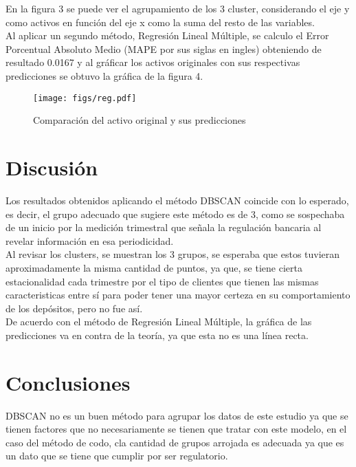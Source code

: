\documentclass{article}
\begin{document}
En la figura 3 se puede ver el agrupamiento de los 3 cluster, considerando el eje y como activos en función del eje x como la suma del resto de las variables.
\\

Al aplicar un segundo método, Regresión Lineal Múltiple, se calculo el Error Porcentual Absoluto Medio (MAPE por sus siglas en ingles) obteniendo de resultado 0.0167 y al gráficar los activos originales con sus respectivas predicciones se obtuvo la gráfica de la figura 4.
\\

\begin{figure}
    \centering
    \texttt{[image: figs/reg.pdf]}
    \caption{Comparación del activo original y sus predicciones}
    \label{}
\end{figure}



\section{Discusión}

Los resultados obtenidos aplicando el método DBSCAN coincide con lo esperado, es decir, 
 el grupo adecuado que sugiere este método es de 3, como se sospechaba de un inicio por la medición trimestral que señala la regulación bancaria al revelar información en esa periodicidad.
\\

 Al revisar los clusters, se muestran los 3 grupos, se esperaba que estos tuvieran aproximadamente la misma cantidad de puntos, ya que, se tiene cierta estacionalidad cada trimestre por el tipo de clientes que tienen las mismas caracteristicas entre sí para poder tener una mayor certeza en su comportamiento de los depósitos, pero no fue así.
\\

 De acuerdo con el método de Regresión Lineal Múltiple, la gráfica de las predicciones va en contra de la teoría, ya que esta no es una línea recta.

\section{Conclusiones}
DBSCAN no es un buen método para agrupar los datos de este estudio ya que se tienen factores que no necesariamente se tienen que tratar con este modelo, en el caso del método de codo, cla cantidad de grupos arrojada es adecuada ya que es un dato que se tiene que cumplir por ser regulatorio.
\\
\end{document}
